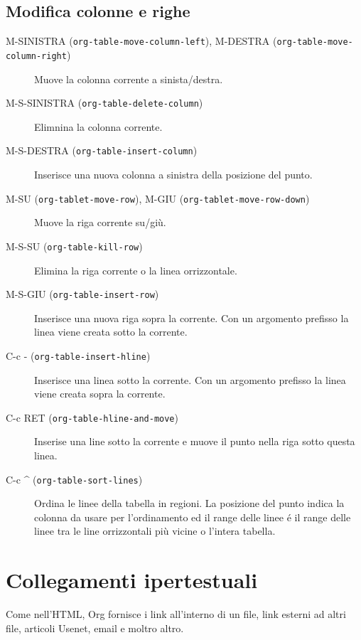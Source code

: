\documentclass[11pt]{article}
\begin{document}
\subsection*{Modifica colonne e righe}
\label{sec:org55611b8}
\begin{description}
\item[{M-SINISTRA (\texttt{org-table-move-column-left}), M-DESTRA (\texttt{org-table-move-column-right})}] Muove la colonna corrente a sinista/destra.

\item[{M-S-SINISTRA (\texttt{org-table-delete-column})}] Elimnina la colonna corrente.

\item[{M-S-DESTRA (\texttt{org-table-insert-column})}] Inserisce una nuova colonna a sinistra della posizione del punto.

\item[{M-SU (\texttt{org-tablet-move-row}), M-GIU (\texttt{org-tablet-move-row-down})}] Muove la riga corrente su/giù.

\item[{M-S-SU (\texttt{org-table-kill-row})}] Elimina la riga corrente o la linea orrizzontale.

\item[{M-S-GIU (\texttt{org-table-insert-row})}] Inserisce una nuova riga sopra la corrente. Con un argomento
prefisso la linea viene creata sotto la corrente.

\item[{C-c - (\texttt{org-table-insert-hline})}] Inserisce una linea sotto la corrente. Con un argomento prefisso la
linea viene creata sopra la corrente.

\item[{C-c RET (\texttt{org-table-hline-and-move})}] Inserise una line sotto la corrente e muove il punto nella riga
sotto questa linea.

\item[{C-c \^{} (\texttt{org-table-sort-lines})}] Ordina le linee della tabella in regioni. La posizione del punto
indica la colonna da usare per l'ordinamento ed il range delle linee
é il range delle linee tra le line orrizzontali più vicine o
l'intera tabella.
\end{description}

\section{Collegamenti ipertestuali}
\label{sec:org651b8f7}
Come nell'HTML, Org fornisce i link all'interno di un file, link
esterni ad altri file, articoli Usenet, email e moltro altro.
\end{document}

